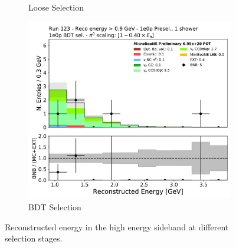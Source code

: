 \begin{figure}[H]
\begin{subfigure}{0.3\textwidth}
    \caption{Loose Selection}
    \end{subfigure}
    \begin{subfigure}{0.3\textwidth}
    \includegraphics[width=1.0\textwidth]{1e0p/High_E_Sideband/BDT_selection/reco_e_highe.pdf}
    \caption{BDT Selection}
    \end{subfigure}
    \caption{Reconstructed energy in the high energy sideband at different selection stages.} 
    \label{fig:1e0p:High_E_sideband:reco_e}
\end{figure}

